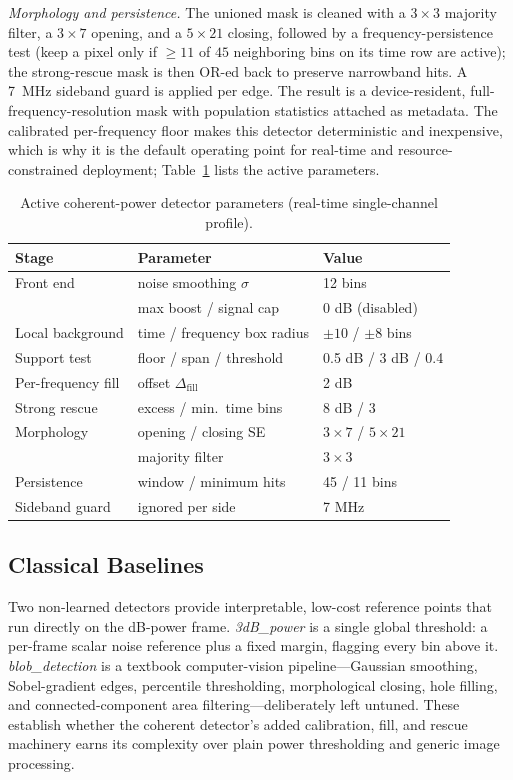 \emph{Morphology and persistence.} The unioned mask is cleaned with a $3\times3$
majority filter, a $3\times7$ opening, and a $5\times21$ closing, followed by a
frequency-persistence test (keep a pixel only if $\ge 11$ of $45$ neighboring bins on
its time row are active); the strong-rescue mask is then OR-ed back to preserve
narrowband hits. A \SI{7}{MHz} sideband guard is applied per edge. The result is a
device-resident, full-frequency-resolution mask with population statistics attached as
metadata. The calibrated per-frequency floor makes this detector deterministic and
inexpensive, which is why it is the default operating point for real-time and
resource-constrained deployment; Table~\ref{tab:params} lists the active parameters.

\begin{table}[t]
\centering
\caption{Active coherent-power detector parameters (real-time single-channel
profile).}
\label{tab:params}
\scriptsize
\setlength{\tabcolsep}{2.5pt}
\begin{tabular}{@{}lll@{}}
\toprule
Stage & Parameter & Value \\
\midrule
Front end & noise smoothing $\sigma$ & 12 bins \\
          & max boost / signal cap & 0 dB (disabled) \\
Local background & time / frequency box radius & $\pm10$ / $\pm8$ bins \\
Support test & floor / span / threshold & 0.5 dB / 3 dB / 0.4 \\
Per-frequency fill & offset $\Delta_{\mathrm{fill}}$ & 2 dB \\
Strong rescue & excess / min.\ time bins & 8 dB / 3 \\
Morphology & opening / closing SE & $3\times7$ / $5\times21$ \\
           & majority filter & $3\times3$ \\
Persistence & window / minimum hits & 45 / 11 bins \\
Sideband guard & ignored per side & 7 MHz \\
\bottomrule
\end{tabular}
\end{table}

\subsection{Classical Baselines}
\label{sec:baselines}

Two non-learned detectors provide interpretable, low-cost reference points that run
directly on the dB-power frame. \emph{3dB\_power} is a single global threshold: a
per-frame scalar noise reference plus a fixed margin, flagging every bin above it.
\emph{blob\_detection} is a textbook computer-vision pipeline---Gaussian smoothing,
Sobel-gradient edges, percentile thresholding, morphological closing, hole filling,
and connected-component area filtering---deliberately left untuned. These establish
whether the coherent detector's added calibration, fill, and rescue machinery earns
its complexity over plain power thresholding and generic image processing.

